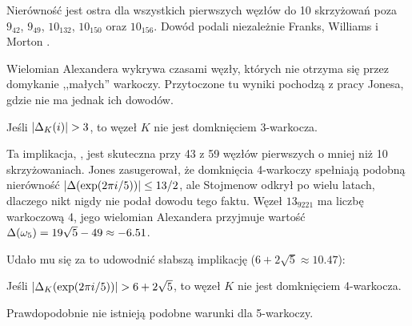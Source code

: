 Nierówność jest ostra dla wszystkich pierwszych węzłów do 10 skrzyżowań poza $9_{42}$, $9_{49}$, $10_{132}$, $10_{150}$ oraz $10_{156}$.
Dowód podali niezależnie Franks, Williams \cite{franks87} i Morton \cite{morton88}.
%
%
%

Wielomian Alexandera wykrywa czasami węzły, których nie otrzyma się przez domykanie ,,małych'' warkoczy.
%
Przytoczone tu wyniki pochodzą z pracy \cite{jones85} Jonesa, gdzie nie ma jednak ich dowodów.

\begin{proposition}
    Jeśli $|\Delta_K(i)| > 3$, to węzeł $K$ nie jest domknięciem 3-warkocza.
\end{proposition}

Ta implikacja, \cite[wniosek 23]{jones85}, jest skuteczna przy 43 z 59 węzłów pierwszych o mniej niż 10 skrzyżowaniach.
Jones \cite[wniosek 24]{jones85} zasugerował, że domknięcia 4-warkoczy spełniają podobną nierówność $|\Delta (\exp (2\pi i / 5))| \le 13/2$, ale Stojmenow \cite{stoimenow02} odkrył po wielu latach, dlaczego nikt nigdy nie podał dowodu tego faktu.
Węzeł $13_{9221}$ ma liczbę warkoczową 4, jego wielomian Alexandera przyjmuje wartość $\Delta(\omega_5) = 19\sqrt{5} - 49 \approx -6.51$.

Udało mu się za to udowodnić słabszą implikację ($6 + 2 \sqrt{5} \approx 10.47$):

\begin{proposition}
    Jeśli $|\Delta_K(\exp(2\pi i/5))| > 6 + 2 \sqrt{5}$, to węzeł $K$ nie jest domknięciem 4-warkocza.
\end{proposition}

Prawdopodobnie nie istnieją podobne warunki dla 5-warkoczy.

%


